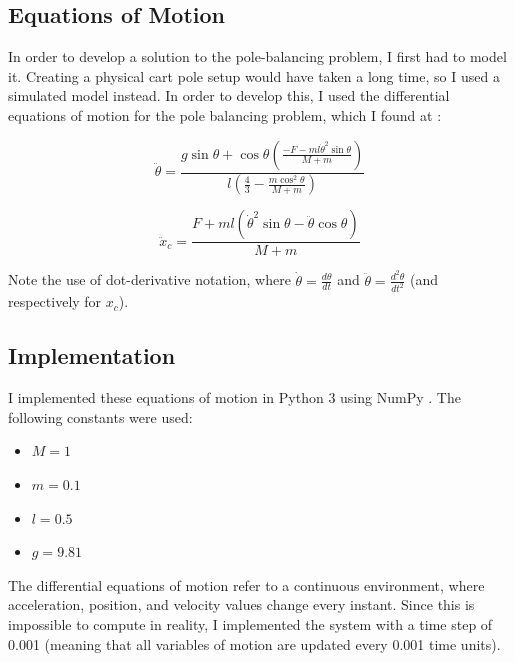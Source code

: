 \documentclass[12pt]{article}
\begin{document}
\subsection{Equations of Motion} \label{equations}

In order to develop a solution to the pole-balancing problem, I first had to model it. Creating a physical cart pole setup would have taken a long time, so I used a simulated model instead. In order to develop this, I used the differential equations of motion for the pole balancing problem, which I found at \cite{polebalancing}:

\begin{equation}
    \ddot \theta = \frac{\displaystyle g \sin \theta + \cos \theta \left( \frac{\displaystyle -F - m l \dot \theta ^2 \sin \theta}{\displaystyle M + m} \right)}{\displaystyle l \left( \frac{\displaystyle 4}{\displaystyle 3} - \frac{\displaystyle m \cos ^2 \theta}{\displaystyle M + m} \right)}
\end{equation}

\begin{equation}
    \ddot x _c = \frac{\displaystyle F + m l \left( \dot \theta ^2 \sin \theta - \ddot \theta \cos \theta \right)}{\displaystyle M + m}
\end{equation}

Note the use of dot-derivative notation, where $\displaystyle \dot \theta = \frac{\displaystyle d \theta}{\displaystyle d t}$ and $\displaystyle \ddot \theta = \frac{\displaystyle d ^2 \theta}{\displaystyle d t ^2}$ (and respectively for $x _c$).

\subsection{Implementation}

I implemented these equations of motion in Python 3 using NumPy \cite{numpy}. The following constants were used:

\begin{itemize}
    \item $M = 1$
    \item $m = 0.1$
    \item $l = 0.5$
    \item $g = 9.81$
\end{itemize}

The differential equations of motion refer to a continuous environment, where acceleration, position, and velocity values change every instant. Since this is impossible to compute in reality, I implemented the system with a time step of 0.001 (meaning that all variables of motion are updated every 0.001 time units).
\end{document}
